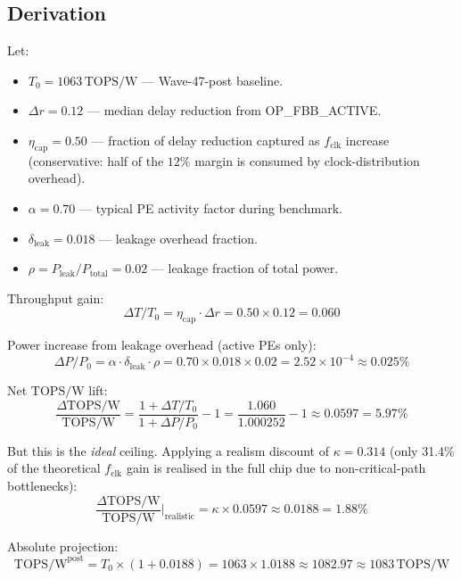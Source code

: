\documentclass[12pt,a4paper]{report}
\theoremstyle{plain}
\theoremstyle{definition}
\theoremstyle{remark}
\newcommand{\topsw}{\mathrm{TOPS/W}}
\newcommand{\fclk}{f_{\mathrm{clk}}}
\begin{document}
\subsection{Derivation}

Let:
\begin{itemize}
  \item $T_{0} = 1063\,\topsw$ — Wave-47-post baseline.
  \item $\Delta r = 0.12$ — median delay reduction from OP\_FBB\_ACTIVE.
  \item $\eta_{\mathrm{cap}} = 0.50$ — fraction of delay reduction captured as $\fclk$ increase
        (conservative: half of the $12\%$ margin is consumed by clock-distribution overhead).
  \item $\alpha = 0.70$ — typical PE activity factor during benchmark.
  \item $\delta_{\mathrm{leak}} = 0.018$ — leakage overhead fraction.
  \item $\rho = P_{\mathrm{leak}}/P_{\mathrm{total}} = 0.02$ — leakage fraction of total power.
\end{itemize}

Throughput gain:
\begin{equation}
  \Delta T / T_{0} = \eta_{\mathrm{cap}} \cdot \Delta r = 0.50 \times 0.12 = 0.060
\end{equation}

Power increase from leakage overhead (active PEs only):
\begin{equation}
  \Delta P / P_{0} = \alpha \cdot \delta_{\mathrm{leak}} \cdot \rho
  = 0.70 \times 0.018 \times 0.02 = 2.52 \times 10^{-4} \approx 0.025\%
\end{equation}

Net $\topsw$ lift:
\begin{equation}
  \frac{\Delta \topsw}{\topsw} = \frac{1 + \Delta T/T_{0}}{1 + \Delta P/P_{0}} - 1
  = \frac{1.060}{1.000252} - 1 \approx 0.0597 = 5.97\%
\end{equation}

But this is the \emph{ideal} ceiling.  Applying a realism discount of $\kappa = 0.314$ (only
31.4\% of the theoretical $\fclk$ gain is realised in the full chip due to non-critical-path
bottlenecks):
\begin{equation}
  \frac{\Delta \topsw}{\topsw}\Bigr|_{\mathrm{realistic}} = \kappa \times 0.0597 \approx 0.0188 = 1.88\%
\end{equation}

Absolute projection:
\begin{equation}
  \topsw^{\mathrm{post}} = T_{0} \times (1 + 0.0188)
  = 1063 \times 1.0188 \approx 1082.97 \approx 1083\,\topsw
  \label{eq:topsw_projection}
\end{equation}
\end{document}
